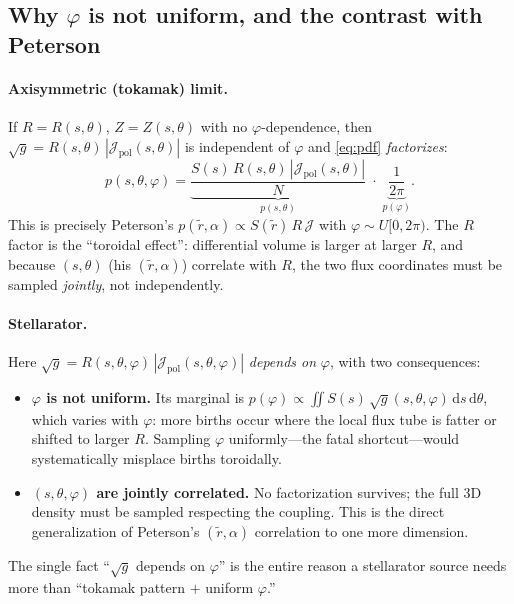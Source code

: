 \documentclass[11pt]{article}
\newcommand{\sg}{\sqrt{g}}
\newcommand{\Jpol}{\mathcal{J}_{\mathrm{pol}}}
\newcommand{\dd}{\,\mathrm{d}}
\begin{document}
\subsection{Why $\varphi$ is not uniform, and the contrast with Peterson}
\label{sec:notuniform}

\paragraph{Axisymmetric (tokamak) limit.} If $R=R(s,\theta)$, $Z=Z(s,\theta)$ with
no $\varphi$-dependence, then $\sg=R(s,\theta)\,|\Jpol(s,\theta)|$ is independent of
$\varphi$ and \eqref{eq:pdf} \emph{factorizes}:
\begin{equation}
p(s,\theta,\varphi)=
\underbrace{\frac{S(s)\,R(s,\theta)\,|\Jpol(s,\theta)|}{N}}_{p(s,\theta)}
\;\cdot\;
\underbrace{\frac{1}{2\pi}}_{p(\varphi)} .
\label{eq:tokamakfactor}
\end{equation}
This is precisely Peterson's $p(\tilde r,\alpha)\propto S(\tilde r)\,R\,\mathcal{J}$
with $\varphi\sim U[0,2\pi)$. The $R$ factor is the ``toroidal effect'': differential
volume is larger at larger $R$, and because $(s,\theta)$ (his $(\tilde r,\alpha)$)
correlate with $R$, the two flux coordinates must be sampled \emph{jointly}, not
independently.

\paragraph{Stellarator.} Here $\sg=R(s,\theta,\varphi)\,|\Jpol(s,\theta,\varphi)|$
\emph{depends on} $\varphi$, with two consequences:
\begin{itemize}
\item \textbf{$\varphi$ is not uniform.} Its marginal is
$p(\varphi)\propto\iint S(s)\,\sg(s,\theta,\varphi)\dd s\dd\theta$, which varies with
$\varphi$: more births occur where the local flux tube is fatter or shifted to
larger $R$. Sampling $\varphi$ uniformly---the fatal shortcut---would systematically
misplace births toroidally.
\item \textbf{$(s,\theta,\varphi)$ are jointly correlated.} No factorization
survives; the full 3D density must be sampled respecting the coupling. This is the
direct generalization of Peterson's $(\tilde r,\alpha)$ correlation to one more
dimension.
\end{itemize}
The single fact ``$\sg$ depends on $\varphi$'' is the entire reason a stellarator
source needs more than ``tokamak pattern $+$ uniform $\varphi$.''
\end{document}
